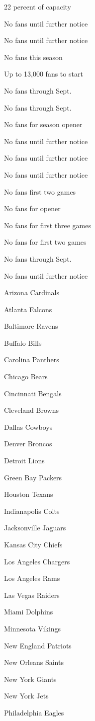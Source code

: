 22 percent of capacity

No fans until further notice

No fans until further notice

No fans this season

Up to 13,000 fans to start

No fans through Sept.

No fans through Sept.

No fans for season opener

No fans until further notice

No fans until further notice

No fans until further notice

No fans first two games

No fans for opener

No fans for first three games

No fans for first two games

No fans through Sept.

No fans until further notice

Arizona Cardinals

Atlanta Falcons

Baltimore Ravens

Buffalo Bills

Carolina Panthers

Chicago Bears

Cincinnati Bengals

Cleveland Browns

Dallas Cowboys

Denver Broncos

Detroit Lions

Green Bay Packers

Houston Texans

Indianapolis Colts

Jacksonville Jaguars

Kansas City Chiefs

Los Angeles Chargers

Los Angeles Rams

Las Vegas Raiders

Miami Dolphins

Minnesota Vikings

New England Patriots

New Orleans Saints

New York Giants

New York Jets

Philadelphia Eagles


